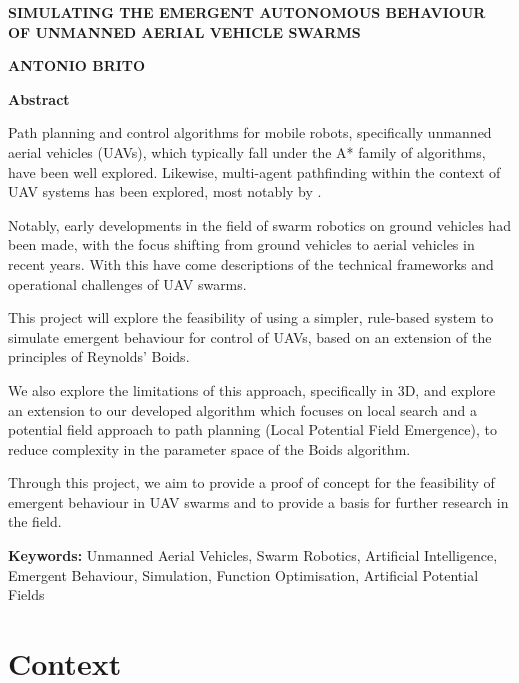 \documentclass[12pt]{article}
\begin{document}
\begin{center}
    \vspace{0.8cm}
    \Large
    \textbf{SIMULATING THE EMERGENT AUTONOMOUS BEHAVIOUR OF UNMANNED AERIAL VEHICLE SWARMS}

    \large
    \vspace{0.8cm}
    \textbf{ANTONIO BRITO}

    \vfill
       
    \Large
    \textbf{Abstract}
    \vspace{2cm}
\end{center}
\onehalfspacing

Path planning and control algorithms for mobile robots, specifically unmanned aerial vehicles (UAVs), which typically fall under the A* family of algorithms, have been well explored\cite{IJSAEM,Chen}. Likewise, multi-agent pathfinding within the context of UAV systems has been explored, most notably by \citet{burwell_2019}.

Notably, early developments in the field of swarm robotics on ground vehicles had been made\cite{Monada}, with the focus shifting from ground vehicles to aerial vehicles in recent years. With this have come descriptions of the technical frameworks\cite{Zhou} and operational challenges of UAV swarms\cite{Verdoucq}.

This project will explore the feasibility of using a simpler, rule-based system to simulate emergent behaviour for control of UAVs, based on an extension of the principles of Reynolds' Boids\cite{Reynolds}.

We also explore the limitations of this approach, specifically in 3D, and explore an extension to our developed algorithm which focuses on local search and a potential field approach to path planning (Local Potential Field Emergence), to reduce complexity in the parameter space of the Boids algorithm.

Through this project, we aim to provide a proof of concept for the feasibility of emergent behaviour in UAV swarms and to provide a basis for further research in the field.

\vspace{2cm}

\noindent\textbf{Keywords:} Unmanned Aerial Vehicles, Swarm Robotics, Artificial Intelligence, Emergent Behaviour, Simulation, Function Optimisation, Artificial Potential Fields

\newpage

\section{Context}
\label{sec:context}
\end{document}

